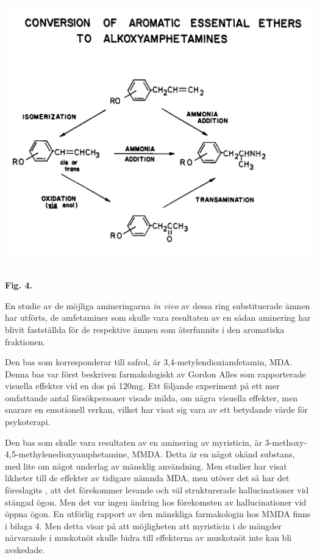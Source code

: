 \documentclass[a4paper,margin=3.25cm]{article}
\begin{document}
{	\hbox{\hspace{0cm}\includegraphics[scale=0.1125]{Figure4}
	}
	\begin{center}\textbf{Fig. 4.}\end{center}


	En studie av de möjliga amineringarna \textit{in vivo} av dessa ring substituerade
	ämnen har utförts, de amfetaminer som skulle vara resultaten av en sådan
	aminering har blivit fastställda för de respektive ämnen som återfunnits
	i den aromatiska fraktionen.

	Den bas som korresponderar till safrol, är 3,4-metylendioxiamfetamin, MDA.
	Denna bas var först beskriven farmakologiskt av Gordon Alles \cite{alles1959some} som
	rapporterade visuella effekter vid en dos på 120mg. Ett följande experiment
	\cite{shulgin1967chemistry} på ett mer omfattande antal försökpersoner visade milda, om några
	visuella effekter, men snarare en emotionell verkan, vilket har visat sig
	vara av ett betydande värde för psykoterapi.

	Den bas som skulle vara resultaten av en aminering av myristicin, är
	3-methoxy-4,5-methylenedioxyamphetamine, MMDA.
	Detta är en något okänd substans, med lite om något underlag av mänsklig användning. Men studier har visat likheter till de effekter av tidigare nämnda MDA, men utöver det så har det föreslagits \cite{shulgin1995pihkal}, att det förekommer levande och väl strukturerade hallucinationer vid stängad ögon. Men det var ingen ändring hos förekomsten av hallucinationer vid öppna ögon. En utförlig rapport av den mänskliga farmakologin hos MMDA finns i bilaga 4.
	Men detta visar på att möjligheten att myristicin i de mängder närvarande i muskotnöt skulle bidra till effekterna av muskotnöt inte kan bli avskedade.

}
\end{document}
